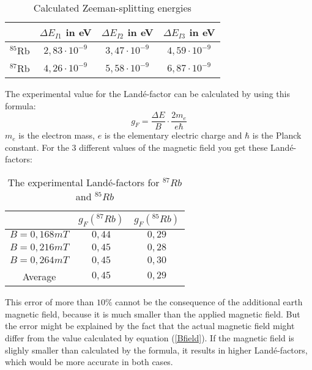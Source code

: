 \begin{table}[h]
	\caption{Calculated Zeeman-splitting energies}
	\begin{tabular}{|c|c|c|c|}
	\hline
	 &  $\Delta E _{I1}$ in eV & $\Delta E _{I2}$ in eV& $\Delta E _{I3}$ in eV \\ \hline
	 $^{85}$Rb & $2,83 \cdot 10^{-9}$ & $3,47 \cdot 10^{-9}$& $4,59\cdot 10^{-9}$ \\ \hline
	 $^{87}$Rb & $4,26 \cdot 10^{-9}$& $5,58\cdot 10^{-9}$ & $6,87 \cdot 10^{-9}$ \\ \hline
	\end{tabular}
\label{Zeeman2}
\end{table}
The experimental value for the Landé-factor can be calculated by using this formula:
\begin{equation}
 g_F=\frac{\Delta E}{B}\cdot \frac{2m_e}{e\hbar}
\end{equation}
$m_e$ is the electron mass, $e$ is the elementary electric charge and $\hbar$ is the Planck constant. 
For the 3 different values of the magnetic field you get these Landé-factors:
\begin{table}[h]
 \caption{The experimental Landé-factors for $^{87}Rb$ and $^{85}Rb$}
 \begin{tabular}{|c|c|c|}
  \hline
  & $g_F(^{87}Rb)$ & $g_F(^{85}Rb)$\\
  \hline $B = 0,168mT$& $0,44$& $0,29$ \\
  \hline $B = 0,216mT$& $0,45$ & $0,28$ \\
  \hline $B = 0,264mT$&$0,45$& $0,30$ \\
  \hline Average & $0,45$& $0,29$\\
  \hline
 \end{tabular}
\end{table}
This error of more than $10\%$ cannot be the consequence of the additional earth magnetic field, because it is much smaller than the applied magnetic field. But the error might be explained by the fact that the actual magnetic field might differ from the value calculated by equation (\ref{Bfield}). If the magnetic field is slighly smaller than calculated by the formula, it results in higher Landé-factors, which would be more accurate in both cases.

